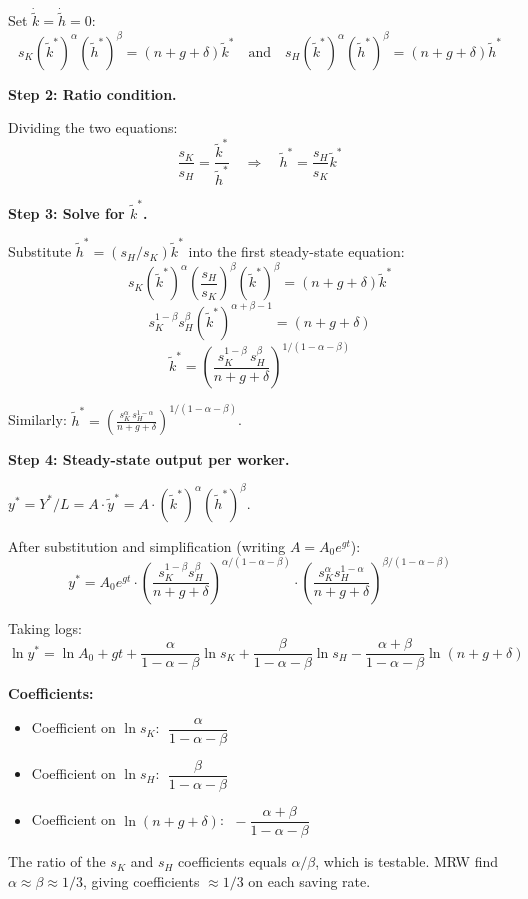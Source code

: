 \documentclass[a4paper,11pt]{article}
\newcommand{\ktilde}{\tilde{k}}
\newcommand{\ytilde}{\tilde{y}}
\begin{document}
\begin{enumerate}[label=\textbf{(\arabic*)},leftmargin=*]
\begin{answerbox}
Set $\dot{\ktilde} = \dot{\tilde{h}} = 0$:
\[
  s_K (\ktilde^*)^{\alpha}(\tilde{h}^*)^{\beta} = (n+g+\delta)\ktilde^*
  \quad\text{and}\quad
  s_H (\ktilde^*)^{\alpha}(\tilde{h}^*)^{\beta} = (n+g+\delta)\tilde{h}^*
\]

\textbf{Step 2: Ratio condition.}

Dividing the two equations:
\[
  \frac{s_K}{s_H} = \frac{\ktilde^*}{\tilde{h}^*} \quad \Longrightarrow \quad \tilde{h}^* = \frac{s_H}{s_K}\ktilde^*
\]

\textbf{Step 3: Solve for $\ktilde^*$.}

Substitute $\tilde{h}^* = (s_H/s_K)\ktilde^*$ into the first steady-state equation:
\[
  s_K (\ktilde^*)^{\alpha} \left(\frac{s_H}{s_K}\right)^{\!\beta} (\ktilde^*)^{\beta} = (n+g+\delta)\ktilde^*
\]
\[
  s_K^{1-\beta} s_H^{\beta} (\ktilde^*)^{\alpha+\beta-1} = (n+g+\delta)
\]
\[
  \boxed{\ktilde^* = \left(\frac{s_K^{1-\beta}\, s_H^{\beta}}{n+g+\delta}\right)^{\!1/(1-\alpha-\beta)}}
\]

Similarly: $\tilde{h}^* = \left(\frac{s_K^{\alpha}\,s_H^{1-\alpha}}{n+g+\delta}\right)^{1/(1-\alpha-\beta)}$.

\textbf{Step 4: Steady-state output per worker.}

$y^* = Y^*/L = A\cdot\ytilde^* = A\cdot(\ktilde^*)^\alpha(\tilde{h}^*)^\beta$.

After substitution and simplification (writing $A = A_0 e^{gt}$):
\[
  y^* = A_0 e^{gt} \cdot \left(\frac{s_K^{1-\beta} s_H^{\beta}}{n+g+\delta}\right)^{\!\alpha/(1-\alpha-\beta)}
  \cdot \left(\frac{s_K^{\alpha} s_H^{1-\alpha}}{n+g+\delta}\right)^{\!\beta/(1-\alpha-\beta)}
\]

Taking logs:
\[
  \boxed{\ln y^* = \ln A_0 + g t
    + \frac{\alpha}{1-\alpha-\beta}\ln s_K
    + \frac{\beta}{1-\alpha-\beta}\ln s_H
    - \frac{\alpha+\beta}{1-\alpha-\beta}\ln(n+g+\delta)}
\]

\textbf{Coefficients:}
\begin{itemize}
  \item Coefficient on $\ln s_K$: $\;\dfrac{\alpha}{1-\alpha-\beta}$
  \item Coefficient on $\ln s_H$: $\;\dfrac{\beta}{1-\alpha-\beta}$
  \item Coefficient on $\ln(n+g+\delta)$: $\;-\dfrac{\alpha+\beta}{1-\alpha-\beta}$
\end{itemize}
The ratio of the $s_K$ and $s_H$ coefficients equals $\alpha/\beta$, which is testable. MRW find $\alpha \approx \beta \approx 1/3$, giving coefficients $\approx 1/3$ on each saving rate.
\end{answerbox}


\end{enumerate}
\end{document}

